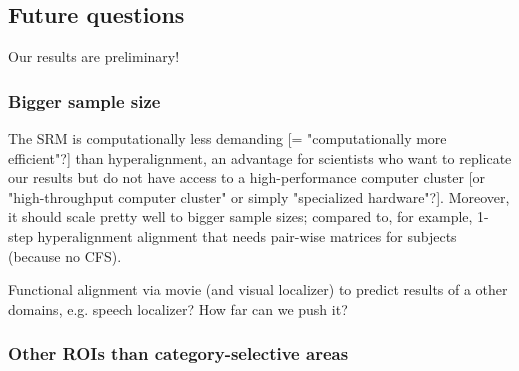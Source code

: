\subsection{Future questions}


Our results are preliminary!

\subsubsection{Bigger sample size}


%
The SRM is computationally less demanding [= "computationally more efficient"?]
than hyperalignment, an advantage for scientists who want to replicate our
results but do not have access to a high-performance computer cluster [or
"high-throughput computer cluster" or simply "specialized hardware"?].
%
Moreover, it should scale pretty well to bigger sample sizes; compared to, for
example, \citet{jiahui2020predicting, jiahui2022cross} 1-step hyperalignment
alignment that needs pair-wise matrices for subjects (because no CFS).


Functional alignment via movie (and visual localizer) to predict results of a
other domains, e.g. speech localizer?
%
How far can we push it?


\subsubsection{Other ROIs than category-selective areas}



